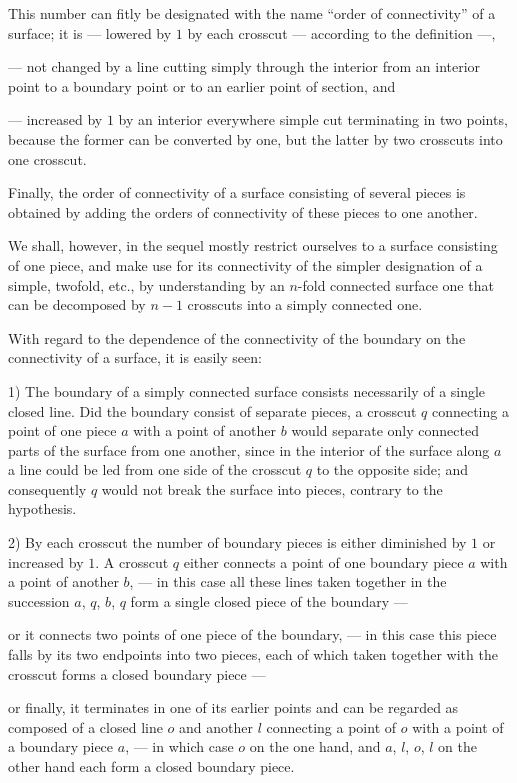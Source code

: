 \documentclass{article}
\begin{document}
This number can fitly be designated with the name ``order of connectivity'' of a surface; it is
--- lowered by $1$ by each crosscut --- according to the definition ---,


--- not changed by a line cutting simply through the interior from an interior point to a boundary point or to an earlier point of section, and


--- increased by $1$ by an interior everywhere simple cut terminating in two points,
because the former can be converted by one, but the latter by two crosscuts into one crosscut.

Finally, the order of connectivity of a surface consisting of several pieces is obtained by adding the orders of connectivity of these pieces to one another.

We shall, however, in the sequel mostly restrict ourselves to a surface consisting of one piece, and make use for its connectivity of the simpler designation of a simple, twofold, etc., by understanding by an $n$-fold connected surface one that can be decomposed by $n-1$ crosscuts into a simply connected one.

With regard to the dependence of the connectivity of the boundary on the connectivity of a surface, it is easily seen:

1) The boundary of a simply connected surface consists necessarily of a single closed line.
Did the boundary consist of separate pieces, a crosscut $q$ connecting a point of one piece $a$ with a point of another $b$ would separate only connected parts of the surface from one another, since in the interior of the surface along $a$ a line could be led from one side of the crosscut $q$ to the opposite side; and consequently $q$ would not break the surface into pieces, contrary to the hypothesis.

2) By each crosscut the number of boundary pieces is either diminished by $1$ or increased by $1$.
A crosscut $q$ either connects a point of one boundary piece $a$ with a point of another $b$, --- in this case all these lines taken together in the succession $a$, $q$, $b$, $q$ form a single closed piece of the boundary ---

or it connects two points of one piece of the boundary, --- in this case this piece falls by its two endpoints into two pieces, each of which taken together with the crosscut forms a closed boundary piece ---

or finally, it terminates in one of its earlier points and can be regarded as composed of a closed line $o$ and another $l$ connecting a point of $o$ with a point of a boundary piece $a$, --- in which case $o$ on the one hand, and $a$, $l$, $o$, $l$ on the other hand each form a closed boundary piece.
\end{document}

